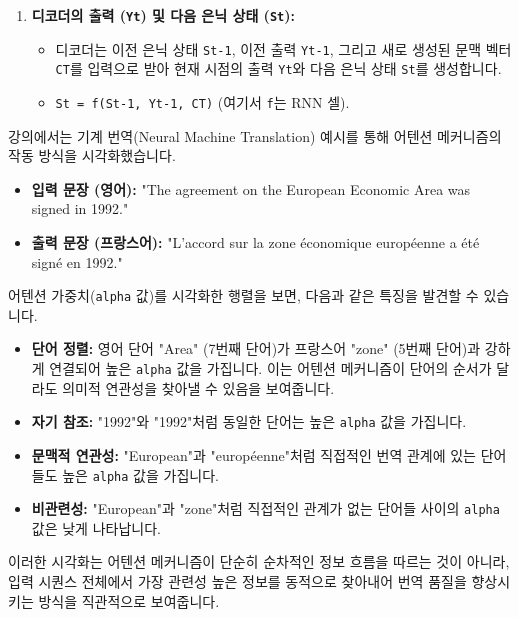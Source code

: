 \documentclass[11pt,a4paper]{article}
\theoremstyle{definition}
\begin{document}
\begin{enumerate}
    \begin{itemize}
        \item 어텐션 가중치 \texttt{alpha_{tj}}를 사용하여 인코더의 모든 은닉 상태 \texttt{Hj}를 가중합하여 \textbf{문맥 벡터(Context Vector)} \texttt{CT}를 생성합니다.
        \item \texttt{CT = sum_{j=1}^{T} (alpha_{tj} * Hj)}
        \item \texttt{CT}는 현재 시점 \texttt{t}의 출력을 생성하는 데 필요한 가장 관련성 높은 정보를 압축한 동적인 표현입니다.
    \end{itemize}
    \item \textbf{디코더의 출력 (\texttt{Yt}) 및 다음 은닉 상태 (\texttt{St}):}
    \begin{itemize}
        \item 디코더는 이전 은닉 상태 \texttt{St-1}, 이전 출력 \texttt{Yt-1}, 그리고 새로 생성된 문맥 벡터 \texttt{CT}를 입력으로 받아 현재 시점의 출력 \texttt{Yt}와 다음 은닉 상태 \texttt{St}를 생성합니다.
        \item \texttt{St = f(St-1, Yt-1, CT)} (여기서 \texttt{f}는 RNN 셀).
    \end{itemize}
\end{enumerate}

\begin{tcolorbox}[example, title={예시: 기계 번역에서의 어텐션 시각화}]
강의에서는 기계 번역(Neural Machine Translation) 예시를 통해 어텐션 메커니즘의 작동 방식을 시각화했습니다.

\begin{itemize}
    \item \textbf{입력 문장 (영어):} "The agreement on the European Economic Area was signed in 1992."
    \item \textbf{출력 문장 (프랑스어):} "L'accord sur la zone économique européenne a été signé en 1992."
\end{itemize}

어텐션 가중치(\texttt{alpha} 값)를 시각화한 행렬을 보면, 다음과 같은 특징을 발견할 수 있습니다.
\begin{itemize}
    \item \textbf{단어 정렬:} 영어 단어 "Area" (7번째 단어)가 프랑스어 "zone" (5번째 단어)과 강하게 연결되어 높은 \texttt{alpha} 값을 가집니다. 이는 어텐션 메커니즘이 단어의 순서가 달라도 의미적 연관성을 찾아낼 수 있음을 보여줍니다.
    \item \textbf{자기 참조:} "1992"와 "1992"처럼 동일한 단어는 높은 \texttt{alpha} 값을 가집니다.
    \item \textbf{문맥적 연관성:} "European"과 "européenne"처럼 직접적인 번역 관계에 있는 단어들도 높은 \texttt{alpha} 값을 가집니다.
    \item \textbf{비관련성:} "European"과 "zone"처럼 직접적인 관계가 없는 단어들 사이의 \texttt{alpha} 값은 낮게 나타납니다.
\end{itemize}
이러한 시각화는 어텐션 메커니즘이 단순히 순차적인 정보 흐름을 따르는 것이 아니라, 입력 시퀀스 전체에서 가장 관련성 높은 정보를 동적으로 찾아내어 번역 품질을 향상시키는 방식을 직관적으로 보여줍니다.
\end{tcolorbox}
\end{document}
